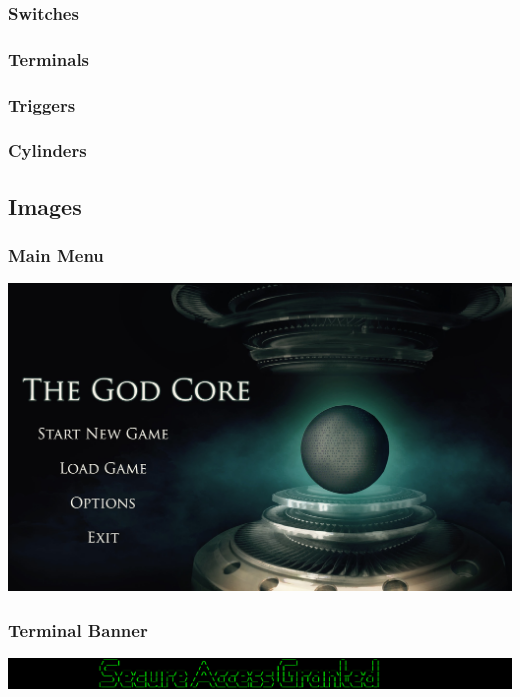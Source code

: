 \documentclass{article}
\begin{document}
\subsubsection{Switches}

\subsubsection{Terminals}

\subsubsection{Triggers}

\tiny{}
\subsubsection{Cylinders}

\small{}
\subsection{Images} \label{subsec:images}

\subsubsection{Main Menu}
	\includegraphics[width=18cm]{../Resources/Images/Main}
\subsubsection{Terminal Banner}
	\includegraphics[width=18cm]{../Resources/Images/banner}
\end{document}
